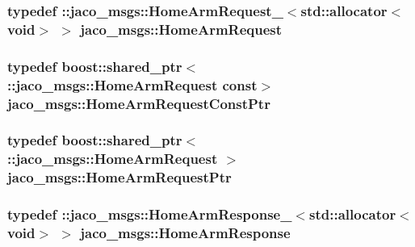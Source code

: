 \subsubsection[{\texorpdfstring{Home\+Arm\+Request}{HomeArmRequest}}]{\setlength{\rightskip}{0pt plus 5cm}typedef \+::{\bf jaco\+\_\+msgs\+::\+Home\+Arm\+Request\+\_\+}$<$std\+::allocator$<$void$>$ $>$ {\bf jaco\+\_\+msgs\+::\+Home\+Arm\+Request}}\hypertarget{namespacejaco__msgs_a8c93ee6cb88452df5f0a3c5aec628121}{}\label{namespacejaco__msgs_a8c93ee6cb88452df5f0a3c5aec628121}
\subsubsection[{\texorpdfstring{Home\+Arm\+Request\+Const\+Ptr}{HomeArmRequestConstPtr}}]{\setlength{\rightskip}{0pt plus 5cm}typedef boost\+::shared\+\_\+ptr$<$ \+::{\bf jaco\+\_\+msgs\+::\+Home\+Arm\+Request} const$>$ {\bf jaco\+\_\+msgs\+::\+Home\+Arm\+Request\+Const\+Ptr}}\hypertarget{namespacejaco__msgs_a120fe0caf767ec219caede5034da5237}{}\label{namespacejaco__msgs_a120fe0caf767ec219caede5034da5237}
\subsubsection[{\texorpdfstring{Home\+Arm\+Request\+Ptr}{HomeArmRequestPtr}}]{\setlength{\rightskip}{0pt plus 5cm}typedef boost\+::shared\+\_\+ptr$<$ \+::{\bf jaco\+\_\+msgs\+::\+Home\+Arm\+Request} $>$ {\bf jaco\+\_\+msgs\+::\+Home\+Arm\+Request\+Ptr}}\hypertarget{namespacejaco__msgs_adacfa509f618d56afb61601724347ef7}{}\label{namespacejaco__msgs_adacfa509f618d56afb61601724347ef7}
\subsubsection[{\texorpdfstring{Home\+Arm\+Response}{HomeArmResponse}}]{\setlength{\rightskip}{0pt plus 5cm}typedef \+::{\bf jaco\+\_\+msgs\+::\+Home\+Arm\+Response\+\_\+}$<$std\+::allocator$<$void$>$ $>$ {\bf jaco\+\_\+msgs\+::\+Home\+Arm\+Response}}\hypertarget{namespacejaco__msgs_a2638ebb5f2f675bb527ce4144b66d386}{}\label{namespacejaco__msgs_a2638ebb5f2f675bb527ce4144b66d386}

